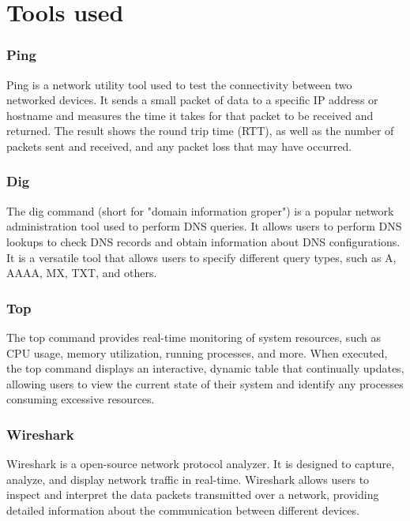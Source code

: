 \section{Tools used}
\subsubsection*{Ping}
Ping is a network utility tool used to test the connectivity between two networked devices.
It sends a small packet of data to a specific IP address or hostname and measures the time it takes for that packet to be received and returned.
The result shows the round trip time (RTT), as well as the number of packets sent and received, and any packet loss that may have occurred.

\subsubsection*{Dig}
The dig command (short for "domain information groper") is a popular network administration tool used to perform DNS queries.
It allows users to perform DNS lookups to check DNS records and obtain information about DNS configurations.
It is a versatile tool that allows users to specify different query types, such as A, AAAA, MX, TXT, and others.

\subsubsection*{Top}
The top command provides real-time monitoring of system resources, such as CPU usage, memory utilization, running processes, and more.
When executed, the top command displays an interactive, dynamic table that continually updates, allowing users to view
the current state of their system and identify any processes consuming excessive resources.

\subsubsection*{Wireshark}
Wireshark is a open-source network protocol analyzer.
It is designed to capture, analyze, and display network traffic in real-time.
Wireshark allows users to inspect and interpret the data packets transmitted over a network, providing detailed information
about the communication between different devices.
